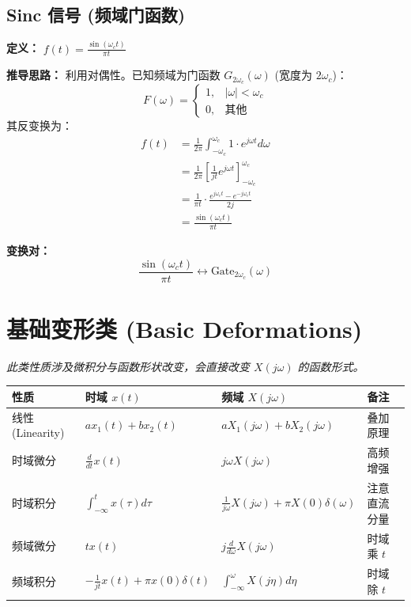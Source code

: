 \hrulefill

\subsection{Sinc 信号 (频域门函数)}
\textbf{定义：} $f(t) = \frac{\sin(\omega_c t)}{\pi t}$

\textbf{推导思路：}
利用对偶性。已知频域为门函数 $G_{2\omega_c}(\omega)$ (宽度为 $2\omega_c$)：
\[ F(\omega) = \begin{cases} 1, & |\omega| < \omega_c \\ 0, & \text{其他} \end{cases} \]
其反变换为：
\begin{align*}
    f(t) &= \frac{1}{2\pi} \int_{-\omega_c}^{\omega_c} 1 \cdot e^{j\omega t} d\omega \\
    &= \frac{1}{2\pi} \left[ \frac{1}{jt} e^{j\omega t} \right]_{-\omega_c}^{\omega_c} \\
    &= \frac{1}{\pi t} \cdot \frac{e^{j\omega_c t} - e^{-j\omega_c t}}{2j} \\
    &= \frac{\sin(\omega_c t)}{\pi t}
\end{align*}

\textbf{变换对：}
\[ \frac{\sin(\omega_c t)}{\pi t} \longleftrightarrow \text{Gate}_{2\omega_c}(\omega) \]

\section{基础变形类 (Basic Deformations)}
\textit{此类性质涉及微积分与函数形状改变，会直接改变 $X(j\omega)$ 的函数形式。}

\begin{table}[h!]
    \centering
    \renewcommand{\arraystretch}{1.6} %
    \begin{tabularx}{\textwidth}{@{} l l L l @{}}
        \toprule
        \textbf{性质} & \textbf{时域} $x(t)$ & \textbf{频域} $X(j\omega)$ & \textbf{备注} \\
        \midrule
        线性 (Linearity) & $ax_1(t) + bx_2(t)$ & $aX_1(j\omega) + bX_2(j\omega)$ & 叠加原理 \\
        时域微分 & $\frac{d}{dt}x(t)$ & $j\omega X(j\omega)$ & 高频增强 \\
        时域积分 & $\int_{-\infty}^t x(\tau)d\tau$ & $\displaystyle \frac{1}{j\omega}X(j\omega) + \pi X(0)\delta(\omega)$ & 注意直流分量 \\
        频域微分 & $tx(t)$ & $j\frac{d}{d\omega}X(j\omega)$ & 时域乘 $t$ \\
        频域积分 & $-\frac{1}{jt}x(t) + \pi x(0)\delta(t)$ & $\displaystyle \int_{-\infty}^\omega X(j\eta)d\eta$ & 时域除 $t$ \\
        \bottomrule
    \end{tabularx}
\end{table}

